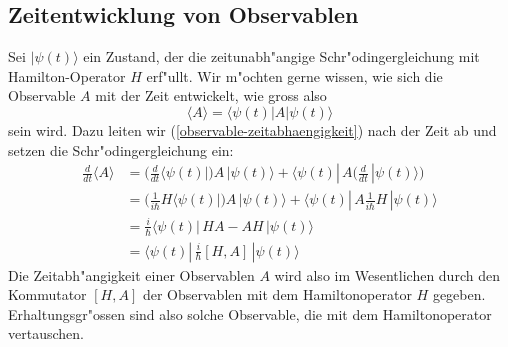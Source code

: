 %
%
\subsection{Zeitentwicklung von Observablen}
Sei $|\psi(t)\rangle$ ein Zustand, der die zeitunabh"angige
Schr"odingergleichung mit Hamilton-Operator $H$ erf"ullt. Wir m"ochten
gerne wissen, wie sich die Observable $A$ mit der Zeit entwickelt,
wie gross also
\begin{equation}
\langle A\rangle
=
\langle \psi(t)|A|\psi(t)\rangle
\label{observable-zeitabhaengigkeit}
\end{equation}
sein wird. Dazu leiten wir (\ref{observable-zeitabhaengigkeit}) nach der
Zeit ab und setzen die Schr"odingergleichung ein:
\begin{align*}
\frac{d}{dt}\langle A\rangle
&=
\biggl(\frac{d}{dt}\langle\psi(t)|\biggr)A\,|\psi(t)\rangle
+
\langle\psi(t)|\,A\biggl(\frac{d}{dt}\,|\psi(t)\rangle\biggr)
\\
&=
\biggl(\frac{1}{i\hbar}H\langle\psi(t)|\biggr)A\,|\psi(t)\rangle
+
\langle\psi(t)|\,A\frac{1}{i\hbar}H\,|\psi(t)\rangle
\\
&=
\frac{i}{\hbar}
\langle\psi(t)|\, HA-AH \,|\psi(t)\rangle
\\
&=\langle\psi(t)|\, \frac{i}{\hbar}[H,A] \,|\psi(t)\rangle
\end{align*}
Die Zeitabh"angigkeit einer Observablen $A$ wird also im Wesentlichen
durch den Kommutator $[H,A]$ der Observablen mit dem Hamiltonoperator $H$
gegeben. Erhaltungsgr"ossen sind also solche Observable, die mit dem
Hamiltonoperator vertauschen.



